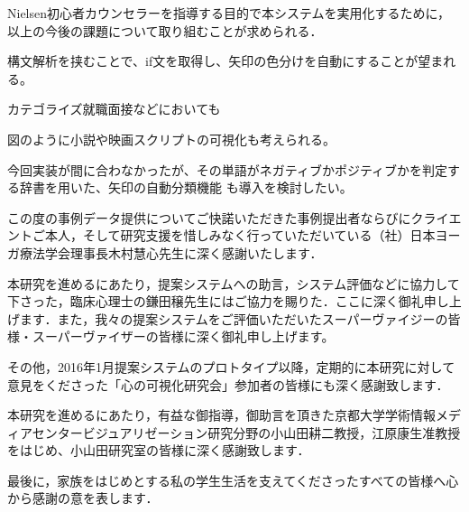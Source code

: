 \documentclass[shuuron]{kuee}
\begin{document}
Nielsen初心者カウンセラーを指導する目的で本システムを実用化するために，以上の今後の課題について取り組むことが求められる．%


構文解析を挟むことで、if文を取得し、矢印の色分けを自動にすることが望まれる。

カテゴライズ就職面接などにおいても

図のように小説や映画スクリプトの可視化も考えられる。

今回実装が間に合わなかったが、その単語がネガティブかポジティブかを判定する辞書を用いた、矢印の自動分類機能\cite{小林のぞみ2005意見抽出のための評価表現の収集} \cite{東山昌彦2008述語の選択選好性に着目した名詞評価極性の獲得} も導入を検討したい。



\begin{acknowledgements}
  この度の事例データ提供についてご快諾いただきた事例提出者ならびにクライエントご本人，そして研究支援を惜しみなく行っていただいている（社）日本ヨーガ療法学会理事長木村慧心先生に深く感謝いたします．

  本研究を進めるにあたり，提案システムへの助言，システム評価などに協力して下さった，臨床心理士の鎌田穣先生にはご協力を賜りた．ここに深く御礼申し上げます．また，我々の提案システムをご評価いただいたスーパーヴァイジーの皆様・スーパーヴァイザーの皆様に深く御礼申し上げます。

  その他，2016年1月提案システムのプロトタイプ以降，定期的に本研究に対して意見をくださった「心の可視化研究会」参加者の皆様にも深く感謝致します．

  本研究を進めるにあたり，有益な御指導，御助言を頂きた京都大学学術情報メディアセンタービジュアリゼーション研究分野の小山田耕二教授，江原康生准教授をはじめ、小山田研究室の皆様に深く感謝致します．




  最後に，家族をはじめとする私の学生生活を支えてくださったすべての皆様へ心から感謝の意を表します．
\end{acknowledgements}





\end{document}
